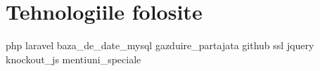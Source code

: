 \chapter{Tehnologiile folosite}
{php}
{laravel}
{baza_de_date_mysql}
{gazduire_partajata}
{github}
{ssl}
{jquery}
{knockout_js}
{mentiuni_speciale}
